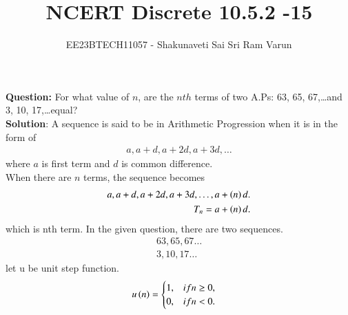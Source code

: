 \documentclass[journal,12pt,twocolumn]{IEEEtran}
\theoremstyle{remark}
\begin{document}

\vspace{3cm}

\title{NCERT Discrete 10.5.2 -15}
\author{EE23BTECH11057 - Shakunaveti Sai Sri Ram Varun$^{}$%
}
\maketitle
\newpage
\bigskip

\renewcommand{\thefigure}{\theenumi}
\renewcommand{\thetable}{\theenumi}
\vspace{2cm}
\textbf{Question: }
For what value of $ n$, are the $ nth$ terms of two A.Ps: 63, 65, 67,\dots and 3, 10, 17,\dots equal?\\
\vspace{0.5cm}
\textbf{Solution}:
A sequence is said to be in Arithmetic Progression when it is in the form of
\begin{align}
a, a+d, a+2d, a+3d, \dots
\end{align}
where $a$ is first term and $d$ is common difference.\\
When there are $ n$ terms, the sequence becomes
\begin{align}
a, a+d, a+2d, a+3d,\dots, a+\left(n\right)d.\\
T_n = a+\left(n\right)d.
\end{align}
which is nth term.
In the given question, there are two sequences.
\begin{align}
63, 65, 67 \dots \label{eq:1}\\
3, 10, 17 \dots \label{eq:2}
\end{align}
let u be unit step function.\\
\begin{align}
u\left(n\right) &=
\begin{cases}
1, & if  n \geq 0, \\
0, & if  n < 0.
\end{cases}
\end{align}
\end{document}
